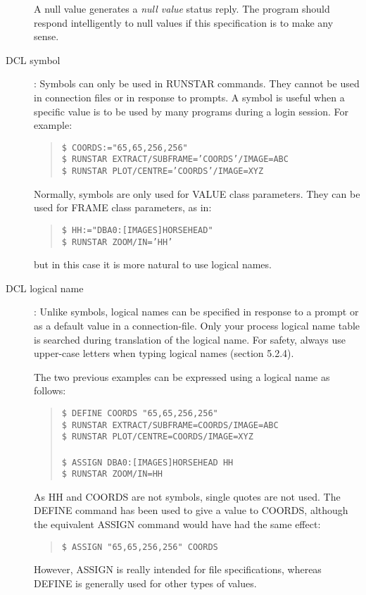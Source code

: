 \documentclass{article}
\begin{document}
\begin{description}
A null value generates a {\em null value} status reply.
The program should respond intelligently to null values if this specification
is to make any sense.
\item [DCL symbol]:
Symbols can only be used in RUNSTAR commands.
They cannot be used in connection files or in response to prompts.
A symbol is useful when a specific value is to be used by many programs during
a login session.
For example:
\begin{quote}
{\tt \$ COORDS:="65,65,256,256"\\
\$ RUNSTAR EXTRACT/SUBFRAME='COORDS'/IMAGE=ABC\\
\$ RUNSTAR PLOT/CENTRE='COORDS'/IMAGE=XYZ}
\end{quote}
Normally, symbols are only used for VALUE class parameters.
They can be used for FRAME class parameters, as in:
\begin{quote}
{\tt \$ HH:="DBA0:[IMAGES]HORSEHEAD"\\
\$ RUNSTAR ZOOM/IN='HH'}
\end{quote}
but in this case it is more natural to use logical names.
\item [DCL logical name]:
Unlike symbols, logical names can be specified in response to a prompt
or as a default value in a connection-file.
Only your process logical name table is searched during translation
of the logical name.
For safety, always use upper-case letters when typing logical names
(section 5.2.4).

The two previous examples can be expressed using a logical name as follows:
\begin{quote}
{\tt \$ DEFINE COORDS "65,65,256,256"\\
\$ RUNSTAR EXTRACT/SUBFRAME=COORDS/IMAGE=ABC\\
\$ RUNSTAR PLOT/CENTRE=COORDS/IMAGE=XYZ\\
\\
\$ ASSIGN  DBA0:[IMAGES]HORSEHEAD  HH\\
\$ RUNSTAR ZOOM/IN=HH}
\end{quote}
As HH and COORDS are not symbols, single quotes are not used.
The DEFINE command has been used to give a value to COORDS, although
the equivalent ASSIGN command would have had the same effect:
\begin{quote}
{\tt \$ ASSIGN "65,65,256,256" COORDS}
\end{quote}
However, ASSIGN is really intended for file specifications, whereas DEFINE
is generally used for other types of values.
\end{description}
\end{document}
